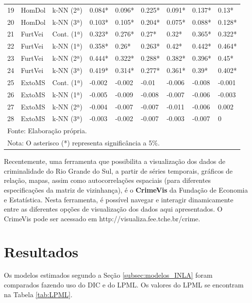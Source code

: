 \documentclass[12pt,openright,oneside,a4paper,english,french,spanish]{abntex2}
\numberwithin{table}{section} %
\numberwithin{figure}{section} %
\begin{document}
\begin{table}[H]
\begin{center}
\begin{small}
\begin{tabular}{rllllllll}
  19 & HomDol & k-NN (2ª) & 0.084* & 0.096* & 0.225* & 0.091* & 0.137* & 0.13* \\ 
  20 & HomDol & k-NN (3ª) & 0.103* & 0.105* & 0.204* & 0.075* & 0.088* & 0.128* \\ 
  21 & FurtVei & Cont. (1ª) & 0.323* & 0.276* & 0.27* & 0.32* & 0.365* & 0.322* \\ 
  22 & FurtVei & k-NN (1ª) & 0.358* & 0.26* & 0.263* & 0.42* & 0.442* & 0.464* \\ 
  23 & FurtVei & k-NN (2ª) & 0.444* & 0.322* & 0.288* & 0.382* & 0.396* & 0.45* \\ 
  24 & FurtVei & k-NN (3ª) & 0.419* & 0.314* & 0.277* & 0.361* & 0.39* & 0.402* \\ 
  25 & ExtoMS & Cont. (1ª) & -0.002 & -0.002 & -0.01 & -0.006 & -0.008 & -0.001 \\ 
  26 & ExtoMS & k-NN (1ª) & -0.005 & -0.009 & -0.008 & -0.007 & -0.006 & -0.003 \\ 
  27 & ExtoMS & k-NN (2ª) & -0.004 & -0.007 & -0.007 & -0.011 & -0.006 & 0.002 \\ 
  28 & ExtoMS & k-NN (3ª) & -0.003 & -0.002 & -0.007 & -0.003 & -0.007 & 0 \\ 
   \hline
\multicolumn{9}{l}{Fonte: Elaboração própria.} \\
\multicolumn{9}{l}{Nota: O asterisco (*) representa significância a 5\%.}
\end{tabular}
\end{small}
\end{center}
\end{table}

Recentemente, uma ferramenta que possibilita a visualização dos dados de criminalidade do Rio Grande do Sul, a partir de séries temporais, gráficos de relação, mapas, assim como autocorrelações espaciais (para diferentes especificações da matriz de vizinhança), é o \textbf{CrimeVis} da Fundação de Economia e Estatística. Nesta ferramenta, é possível navegar e interagir dinamicamente entre as diferentes opções de visualização dos dados aqui apresentados. O CrimeVis pode ser acessado em http://visualiza.fee.tche.br/crime.

\section{Resultados\label{sec:modelos_indice}}

Os modelos estimados segundo a Seção \ref{subsec:modelos_INLA} foram comparados fazendo uso do DIC e do LPML. Os valores do LPML se encontram na Tabela \ref{tab:LPML}.
\end{document}
